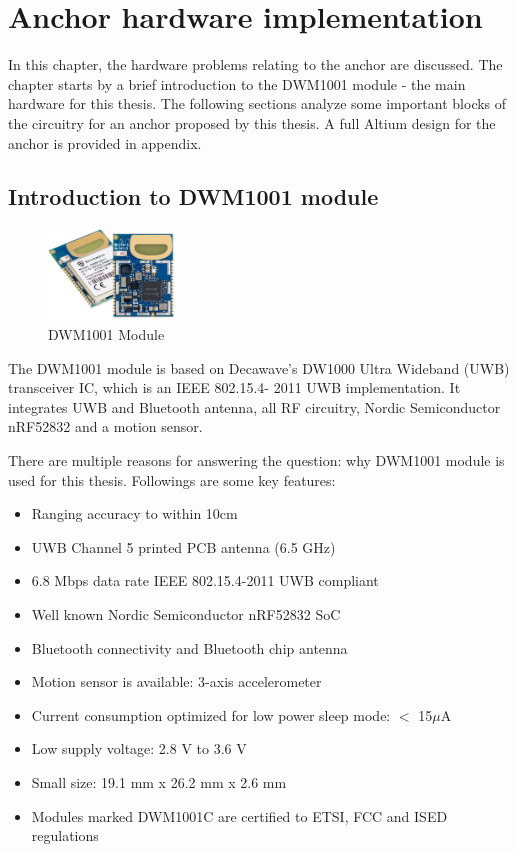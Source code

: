 \documentclass[\main/main.tex]{subfiles}
\begin{document}
\graphicspath{{img/}{04_hardware/img/}}
\setlength{\abovecaptionskip}{0pt}
\setlength{\belowcaptionskip}{0pt}

\chapter{Anchor hardware implementation}
In this chapter, the hardware problems relating to the anchor are discussed. The chapter starts by a brief introduction to the DWM1001 module - the main hardware for this thesis. The following sections analyze some important blocks of the circuitry for an anchor proposed by this thesis. A full Altium design for the anchor is provided in appendix.

\section{Introduction to DWM1001 module}
\begin{figure}[H]
    \begin{center}
        \includegraphics[width=0.3\textwidth]{DWM1001-Module_ProdPage_600x430.jpg}
    \end{center}
    \caption{DWM1001 Module}
    \label{fig:dwm1001c_module}
\end{figure}

The DWM1001 module is based on Decawave's DW1000 Ultra
Wideband (UWB) transceiver IC, which is an IEEE 802.15.4-
2011 UWB implementation. It integrates UWB and Bluetooth
antenna, all RF circuitry, Nordic Semiconductor nRF52832 and
a motion sensor.

There are multiple reasons for answering the question: why DWM1001 module is used for this thesis.
Followings are some key features:
\begin{itemize}
    \item Ranging accuracy to within 10cm
    \item UWB Channel 5 printed PCB antenna (6.5 GHz)
    \item 6.8 Mbps data rate IEEE 802.15.4-2011 UWB compliant
    \item Well known Nordic Semiconductor nRF52832 SoC
    \item Bluetooth connectivity and Bluetooth chip antenna
    \item Motion sensor is available: 3-axis accelerometer
    \item Current consumption optimized for low power sleep mode: $<$ 15$\mu$A
    \item Low supply voltage: 2.8 V to 3.6 V
    \item Small size: 19.1 mm x 26.2 mm x 2.6 mm
    \item Modules marked DWM1001C are certified to ETSI, FCC and ISED regulations
\end{itemize}
\end{document}

